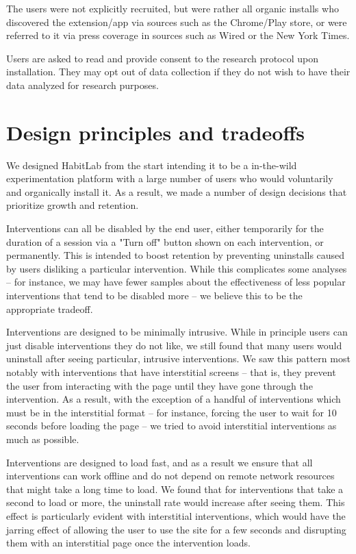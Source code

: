 The users were not explicitly recruited, but were rather all organic installs who discovered the extension/app via sources such as the Chrome/Play store, or were referred to it via press coverage in sources such as Wired or the New York Times.


Users are asked to read and provide consent to the research protocol upon installation. They may opt out of data collection if they do not wish to have their data analyzed for research purposes.

\section{Design principles and tradeoffs}

We designed HabitLab from the start intending it to be a in-the-wild experimentation platform with a large number of users who would voluntarily and organically install it. As a result, we made a number of design decisions that prioritize growth and retention.

Interventions can all be disabled by the end user, either temporarily for the duration of a session via a "Turn off" button shown on each intervention, or permanently. This is intended to boost retention by preventing uninstalls caused by users disliking a particular intervention. While this complicates some analyses -- for instance, we may have fewer samples about the effectiveness of less popular interventions that tend to be disabled more -- we believe this to be the appropriate tradeoff.

Interventions are designed to be minimally intrusive. While in principle users can just disable interventions they do not like, we still found that many users would uninstall after seeing particular, intrusive interventions. We saw this pattern most notably with interventions that have interstitial screens -- that is, they prevent the user from interacting with the page until they have gone through the intervention. As a result, with the exception of a handful of interventions which must be in the interstitial format -- for instance, forcing the user to wait for 10 seconds before loading the page -- we tried to avoid interstitial interventions as much as possible.

Interventions are designed to load fast, and as a result we ensure that all interventions can work offline and do not depend on remote network resources that might take a long time to load. We found that for interventions that take a second to load or more, the uninstall rate would increase after seeing them. This effect is particularly evident with interstitial interventions, which would have the jarring effect of allowing the user to use the site for a few seconds and disrupting them with an interstitial page once the intervention loads.

